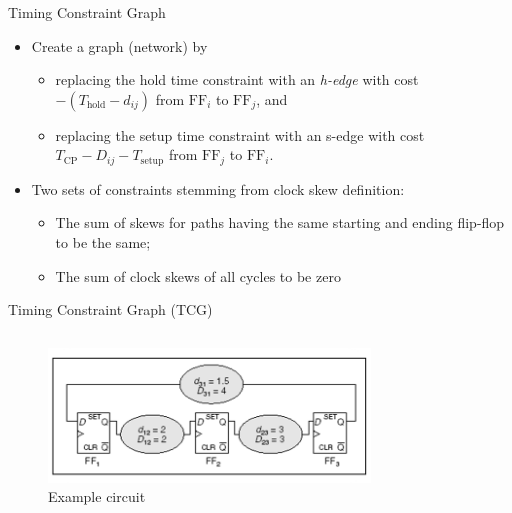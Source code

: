 \documentclass[10pt,ignorenonframetext,mathserif,onlymath]{beamer}
\providecommand{\tightlist}{%
  \setlength{\itemsep}{0pt}\setlength{\parskip}{0pt}}
\begin{document}
\begin{frame}{Timing Constraint Graph}
\protect\hypertarget{timing-constraint-graph}{}

\begin{itemize}
\tightlist
\item
  Create a graph (network) by

  \begin{itemize}
  \tightlist
  \item
    replacing the hold time constraint with an \emph{h-edge} with cost
    \(-(T_\text{hold} - d_{ij})\) from \(\text{FF}_i\) to
    \(\text{FF}_j\), and
  \item
    replacing the setup time constraint with an s-edge with cost
    \(T_\text{CP} - D_{ij} - T_\text{setup}\) from \(\text{FF}_j\) to
    \(\text{FF}_i\).
  \end{itemize}
\item
  Two sets of constraints stemming from clock skew definition:

  \begin{itemize}
  \tightlist
  \item
    The sum of skews for paths having the same starting and ending
    flip-flop to be the same;
  \item
    The sum of clock skews of all cycles to be zero
  \end{itemize}
\end{itemize}

\end{frame}

\begin{frame}{Timing Constraint Graph (TCG)}
\protect\hypertarget{timing-constraint-graph-tcg}{}

\begin{columns}

\begin{figure}
\centering
\includegraphics{lec05.files/fig05.png}
\caption{Example circuit}
\end{figure}


\begin{figure}[h!]
\centering

\end{figure}
\end{columns}

\end{frame}
\end{document}
